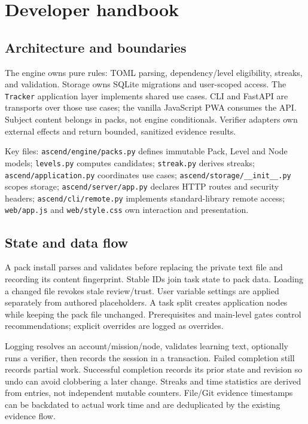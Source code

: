 \section{Developer handbook}
\subsection{Architecture and boundaries}
The engine owns pure rules: TOML parsing, dependency/level eligibility, streaks,
and validation. Storage owns SQLite migrations and user-scoped access. The
\texttt{Tracker} application layer implements shared use cases. CLI and FastAPI
are transports over those use cases; the vanilla JavaScript PWA consumes the API.
Subject content belongs in packs, not engine conditionals. Verifier adapters own
external effects and return bounded, sanitized evidence results.

Key files: \texttt{ascend/engine/packs.py} defines immutable Pack, Level and Node
models; \texttt{levels.py} computes candidates; \texttt{streak.py} derives streaks;
\texttt{ascend/application.py} coordinates use cases;
\texttt{ascend/storage/\_\_init\_\_.py} scopes storage;
\texttt{ascend/server/app.py} declares HTTP routes and security headers;
\texttt{ascend/cli/remote.py} implements standard-library remote access;
\texttt{web/app.js} and \texttt{web/style.css} own interaction and presentation.

\subsection{State and data flow}
A pack install parses and validates before replacing the private text file and
recording its content fingerprint. Stable IDs join task state to pack data.
Loading a changed file revokes stale review/trust. User variable settings are
applied separately from authored placeholders. A task split creates application
nodes while keeping the pack file unchanged. Prerequisites and main-level gates
control recommendations; explicit overrides are logged as overrides.

Logging resolves an account/mission/node, validates learning text, optionally runs
a verifier, then records the session in a transaction. Failed completion still
records partial work. Successful completion records its prior state and revision
so undo can avoid clobbering a later change. Streaks and time statistics are derived
from entries, not independent mutable counters. File/Git evidence timestamps can
be backdated to actual work time and are deduplicated by the existing evidence flow.

